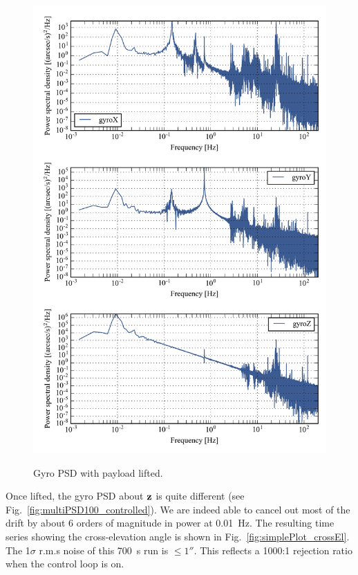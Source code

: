 \begin{figure}[!h]
\begin{center}
\includegraphics{Figures/lifted_400.png}
\label{fig:multiPSD400_lifted}
\vspace{-0.5cm}
\caption[Gyro PSD with payload lifted]{Gyro PSD with payload lifted.}
\end{center}
\end{figure}


Once lifted, the gyro PSD about $\textrm{\textbf{z}}$ is quite different (see Fig.~\ref{fig:multiPSD100_controlled}). We are indeed able to cancel out most of the drift by about 6 orders of magnitude in power at \SI{0.01}{\hertz}. The resulting time series showing the cross-elevation angle is shown in Fig.~\ref{fig:simplePlot_crossEl}. The 1$\sigma$ r.m.s noise of this \SI{700}{\second} run is $\le\ang{;;1}$. This reflects a 1000:1 rejection ratio when the control loop is on.

